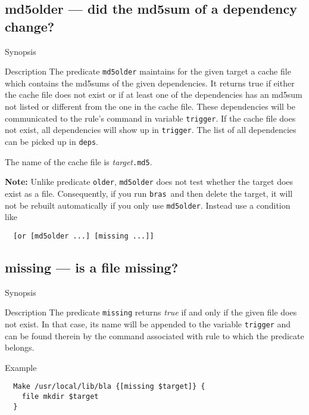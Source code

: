 \documentclass[11pt,bibtotoc,idxtotoc]{scrreprt}
\newcommand{\bras}{\texttt{bras}}
\begin{document}
\subsection{md5older --- did the md5sum of a dependency change?}
\begin{Describe}
\item[Synopsis]  
\item[Description] The predicate \texttt{md5older} maintains for the
  given target a cache file which contains the md5sums of the given
  dependencies. It returns true if either the cache file does not
  exist or if at least one of the dependencies has an md5sum not
  listed or different from the one in the cache file. These
  dependencies will be communicated to the rule's command in variable
  \texttt{trigger}. If the cache file does not exist, all dependencies
  will show up in \texttt{trigger}. The list of all dependencies can
  be picked up in \texttt{deps}.

  The name of the cache file is \textit{target}\texttt{.md5}. 

  \textbf{Note:} Unlike predicate \texttt{older}, \texttt{md5older}
  does not test whether the target does exist as a file. Consequently,
  if you run \bras\ and then delete the target, it will not be rebuilt
  automatically if you only use \texttt{md5older}. Instead use a
  condition like \begin{verbatim}
  [or [md5older ...] [missing ...]]
\end{verbatim}
    
\end{Describe}


\subsection{missing --- is a file missing?}
\begin{Describe}
\item[Synopsis]  
\item[Description] The predicate \texttt{missing} returns
  \textit{true} if and only if the given file does not exist. In that
  case, its name will be appended to the variable \texttt{trigger} and
  can be found therein by the command associated with rule to which
  the predicate belongs.
\item[Example]
\begin{verbatim}
  Make /usr/local/lib/bla {[missing $target]} { 
    file mkdir $target
  }
\end{verbatim}
\end{Describe}
\end{document}
